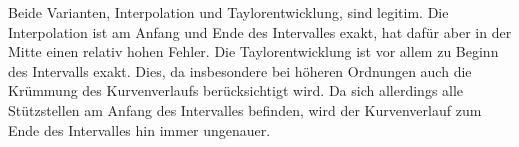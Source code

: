 Beide Varianten, Interpolation und Taylorentwicklung, sind legitim. 
Die Interpolation ist am Anfang und Ende des Intervalles exakt, hat dafür aber in der Mitte einen relativ hohen Fehler. 
Die Taylorentwicklung ist vor allem zu Beginn des Intervalls exakt. 
Dies, da insbesondere bei höheren Ordnungen auch die Krümmung des Kurvenverlaufs berücksichtigt wird.
 Da sich allerdings alle Stützstellen am Anfang des Intervalles befinden, wird der Kurvenverlauf zum Ende des Intervalles hin immer ungenauer.
